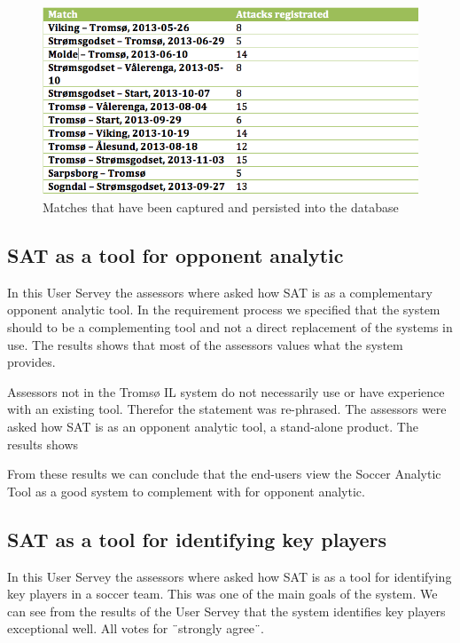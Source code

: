 \begin{figure}[ht!]
\centering
\includegraphics[width=1\textwidth]{images/general/matched_regged.png}
\caption{Matches that have been captured and persisted into the database}
\label{fig:matches_regged}
\end{figure}

\subsection{SAT as a tool for opponent analytic}

In this User Servey the assessors where asked how SAT is as a complementary opponent analytic tool. In the requirement process we specified that the system should to be a complementing tool and not a direct replacement of the systems in use. The results shows that most of the assessors values what the system provides. 

Assessors not in the Tromsø IL system do not necessarily use or have experience with an existing tool. Therefor the statement was re-phrased. The assessors were asked how SAT is as an opponent analytic tool, a stand-alone product. The results shows

From these results we can conclude that the end-users view the Soccer Analytic Tool as a good system to complement with for opponent analytic. 

\subsection{SAT as a tool for identifying key players}

In this User Servey the assessors where asked how SAT is as a tool for identifying key players in a soccer team. This was one of the main goals of the system. We can see from the results of the User Servey that the system identifies key players exceptional well. All votes for ¨strongly agree¨. 

